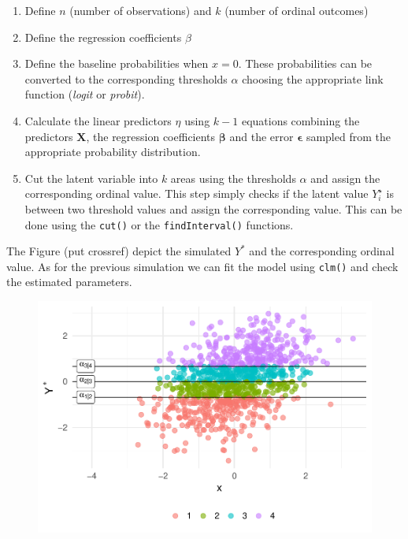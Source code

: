 \documentclass[
  man,floatsintext]{apa6}
\providecommand{\tightlist}{%
  \setlength{\itemsep}{0pt}\setlength{\parskip}{0pt}}
\begin{document}
\begin{enumerate}
\def\labelenumi{\arabic{enumi}.}
\tightlist
\item
  Define \(n\) (number of observations) and \(k\) (number of ordinal outcomes)
\item
  Define the regression coefficients \(\beta\)
\item
  Define the baseline probabilities when \(x = 0\). These probabilities can be converted to the corresponding thresholds \(\alpha\) choosing the appropriate link function (\emph{logit} or \emph{probit}).
\item
  Calculate the linear predictors \(\eta\) using \(k - 1\) equations combining the predictors \(\mathbf{X}\), the regression coefficients \(\mathbf{\beta}\) and the error \(\mathbf{\epsilon}\) sampled from the appropriate probability distribution.
\item
  Cut the latent variable into \(k\) areas using the thresholds \(\alpha\) and assign the corresponding ordinal value. This step simply checks if the latent value \(Y^{\star}_i\) is between two threshold values and assign the corresponding value. This can be done using the \texttt{cut()} or the \texttt{findInterval()} functions.
\end{enumerate}

The Figure (put crossref) depict the simulated \(Y^{*}\) and the corresponding ordinal value. As for the previous simulation we can fit the model using \texttt{clm()} and check the estimated parameters.

\begin{figure}

{\centering \includegraphics{paper-new_files/figure-latex/unnamed-chunk-18-1} 

}

\caption{ }\label{fig:unnamed-chunk-18}
\end{figure}
\end{document}
